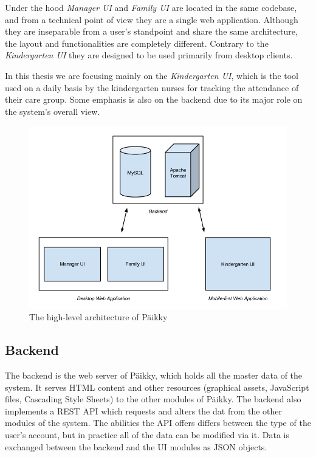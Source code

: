 Under the hood \textit{Manager UI} and \textit{Family UI} are located in the same codebase, and from a technical point of view they are a single web application. Although they are inseparable from a user's standpoint and share the same architecture, the layout and functionalities are completely different. Contrary to the \textit{Kindergarten UI} they are designed to be used primarily from desktop clients. 

In this thesis we are focusing mainly on the \textit{Kindergarten UI}, which is the tool used on a daily basis by the kindergarten nurses for tracking the attendance of their care group. Some emphasis is also on the backend due to its major role on the system's overall view.

\begin{figure}[t]
\begin{center}
\includegraphics[width=1\textwidth]{assets/architecture.png}
\end{center}
\caption{The high-level architecture of Päikky}
\label{fig:architecture}
\end{figure}



\subsection{Backend}

The backend is the web server of Päikky, which holds all the master data of the system. It serves HTML content and other resources (graphical assets, JavaScript files, Cascading Style Sheets) to the other modules of Päikky. The backend also implements a REST API which requests and alters the dat from the other modules of the system. The abilities the API offers differs between the type of the user's account, but in practice all of the data can be modified via it. Data is exchanged between the backend and the UI modules as JSON objects.

